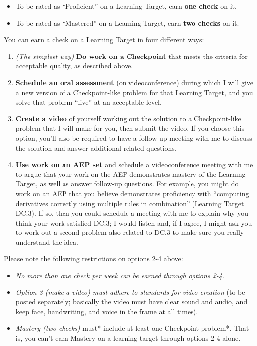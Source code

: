 \documentclass[]{article}
\providecommand{\tightlist}{%
  \setlength{\itemsep}{0pt}\setlength{\parskip}{0pt}}
\begin{document}
\begin{itemize}
\tightlist
\item
  To be rated as ``Proficient'' on a Learning Target, earn \textbf{one
  check} on it.
\item
  To be rated as ``Mastered'' on a Learning Target, earn \textbf{two
  checks} on it.
\end{itemize}

You can earn a check on a Learning Target in four different ways:

\begin{enumerate}
\def\labelenumi{\arabic{enumi}.}
\tightlist
\item
  \emph{(The simplest way)} \textbf{Do work on a Checkpoint} that meets
  the criteria for acceptable quality, as described above.
\item
  \textbf{Schedule an oral assessment} (on videoconference) during which
  I will give a new version of a Checkpoint-like problem for that
  Learning Target, and you solve that problem ``live'' at an acceptable
  level.
\item
  \textbf{Create a video} of yourself working out the solution to a
  Checkpoint-like problem that I will make for you, then submit the
  video. If you choose this option, you'll also be required to have a
  follow-up meeting with me to discuss the solution and answer
  additional related questions.
\item
  \textbf{Use work on an AEP set} and schedule a videoconference meeting
  with me to argue that your work on the AEP demonstrates mastery of the
  Learning Target, as well as answer follow-up questions. For example,
  you might do work on an AEP that you believe demonstrates proficiency
  with ``computing derivatives correctly using multiple rules in
  combination'' (Learning Target DC.3). If so, then you could schedule a
  meeting with me to explain why you think your work satisfied DC.3; I
  would listen and, if I agree, I might ask you to work out a second
  problem also related to DC.3 to make sure you really understand the
  idea.
\end{enumerate}

Please note the following restrictions on options 2-4 above:

\begin{itemize}
\tightlist
\item
  \emph{No more than one check per week can be earned through options
  2-4}.
\item
  \emph{Option 3 (make a video) must adhere to standards for video
  creation} (to be posted separately; basically the video must have
  clear sound and audio, and keep face, handwriting, and voice in the
  frame at all times).
\item
  \emph{Mastery (two checks) }must* include at least one Checkpoint
  problem*. That is, you can't earn Mastery on a learning target through
  options 2-4 alone.
\end{itemize}
\end{document}
